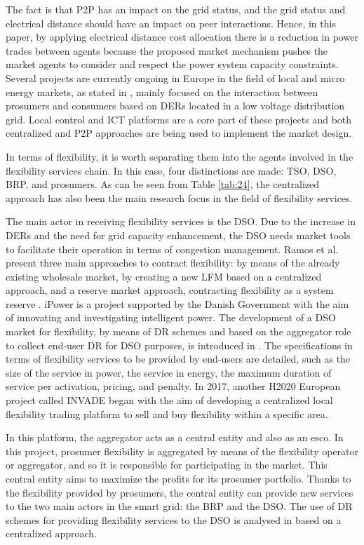 The fact is that P2P has an impact on the grid status, and the grid status and electrical distance should have an impact on peer interactions. Hence, in this paper, by applying electrical distance cost allocation there is a reduction in power trades between agents because the proposed market mechanism pushes the market agents to consider and respect the power system capacity constraints.
Several projects are currently ongoing in Europe in the field of local and micro energy markets, as stated in \cite{sousa2018peer}, mainly focused on the interaction between prosumers and consumers based on DERs located in a low voltage distribution grid. Local control and ICT platforms are a core part of these projects and both centralized \cite{ilieva2016design} and P2P \cite{moret2018energy, Enerchain, mihaylov2014nrgcoin} approaches are being used to implement the market design.

In terms of flexibility, it is worth separating them into the agents involved in the flexibility services chain. In this case, four distinctions are made: TSO, DSO, BRP, and prosumers. As can be seen from Table \ref{tab:24}, the centralized approach has also been the main research focus in the field of flexibility services. 

The main actor in receiving flexibility services is the DSO. Due to the increase in DERs and the need for grid capacity enhancement, the DSO needs market tools to facilitate their operation in terms of congestion management. Ramos et al. present three main approaches to contract flexibility: by means of the already existing wholesale market, by creating a new LFM based on a centralized approach, and a reserve market approach, contracting flexibility as a system reserve \cite{ramos2016realizing}. iPower is a project supported by the Danish Government with the aim of innovating and investigating intelligent power. The development of a DSO market for flexibility, by means of DR schemes and based on the aggregator role to collect end-user DR for DSO purposes, is introduced in \cite{nordentoft2013development}. The specifications in terms of flexibility services to be provided by end-users are detailed, such as the size of the service in power, the service in energy, the maximum duration of service per activation, pricing, and penalty. In 2017, another H2020 European project called INVADE began \cite{Olivella2018} with the aim of developing a centralized local flexibility trading platform to sell and buy flexibility within a specific area.

In this platform, the aggregator acts as a central entity and also as an esco. In this project, prosumer flexibility is aggregated by means of the flexibility operator or aggregator, and so it is responsible for participating in the market. This central entity aims to maximize the profits for its prosumer portfolio. Thanks to the flexibility provided by prosumers, the central entity can provide new services to the two main actors in the smart grid: the BRP and the DSO. The use of DR schemes for providing flexibility services to the DSO is analysed in \cite{spiliotis2016demand, poudineh2014distributed} based on a centralized approach.

